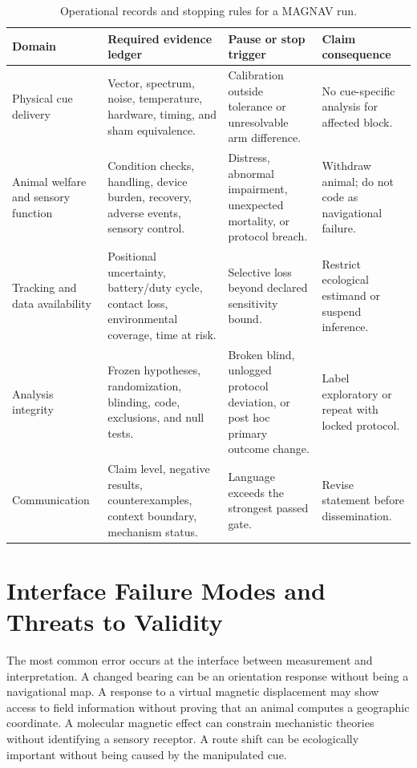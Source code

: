 \documentclass[conference]{IEEEtran}
\begin{document}
\begin{table}[!t]
\caption{Operational records and stopping rules for a MAGNAV run.}\label{tab:governance}\centering\footnotesize
\begin{tabular}{@{}L{.20\textwidth}L{.27\textwidth}L{.25\textwidth}L{.20\textwidth}@{}}\toprule
Domain & Required evidence ledger & Pause or stop trigger & Claim consequence\\\midrule
Physical cue delivery & Vector, spectrum, noise, temperature, hardware, timing, and sham equivalence. & Calibration outside tolerance or unresolvable arm difference. & No cue-specific analysis for affected block.\\
Animal welfare and sensory function & Condition checks, handling, device burden, recovery, adverse events, sensory control. & Distress, abnormal impairment, unexpected mortality, or protocol breach. & Withdraw animal; do not code as navigational failure.\\
Tracking and data availability & Positional uncertainty, battery/duty cycle, contact loss, environmental coverage, time at risk. & Selective loss beyond declared sensitivity bound. & Restrict ecological estimand or suspend inference.\\
Analysis integrity & Frozen hypotheses, randomization, blinding, code, exclusions, and null tests. & Broken blind, unlogged protocol deviation, or post hoc primary outcome change. & Label exploratory or repeat with locked protocol.\\
Communication & Claim level, negative results, counterexamples, context boundary, mechanism status. & Language exceeds the strongest passed gate. & Revise statement before dissemination.\\\bottomrule
\end{tabular}
\end{table}

\section{Interface Failure Modes and Threats to Validity}\label{sec:threats}
The most common error occurs at the interface between measurement and interpretation. A changed bearing can be an orientation response without being a navigational map. A response to a virtual magnetic displacement may show access to field information without proving that an animal computes a geographic coordinate. A molecular magnetic effect can constrain mechanistic theories without identifying a sensory receptor. A route shift can be ecologically important without being caused by the manipulated cue.
\end{document}
